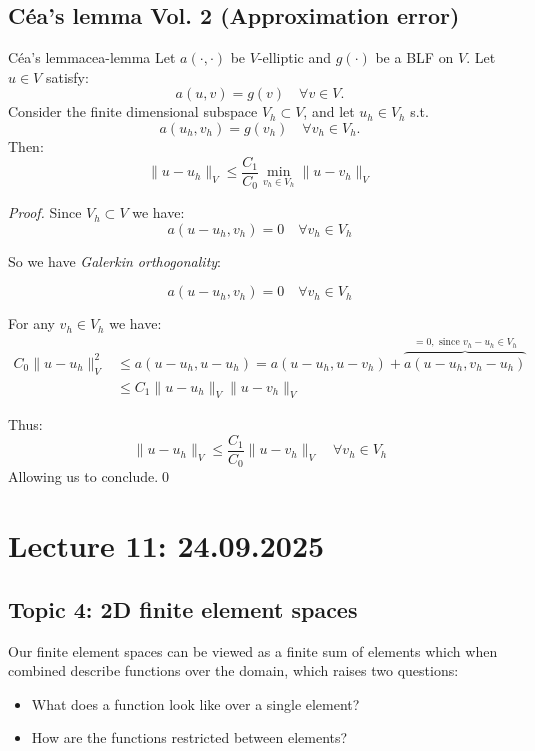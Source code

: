 \subsection{Céa's lemma Vol. 2 (Approximation error)}
\begin{theorem}{Céa's lemma}{cea-lemma}
    Let $a(\cdot, \cdot)$ be $V$-elliptic and $g(\cdot)$ be a BLF on $V$. Let $u \in V$ satisfy:
    \[
        a(u, v) = g(v) \quad \forall v \in V.
    \]
    Consider the finite dimensional subspace $V_h \subset V$, and let $u_h \in V_h$ s.t.
    \[
        a(u_h, v_h) = g(v_h) \quad \forall v_h \in V_h.
    \]
    Then:
    \[
        \|u - u_h\|_V \leq \frac{C_1}{C_0} \min_{v_h \in V_h} \|u - v_h\|_V
    \]
\end{theorem}
\begin{proof}
    Since $V_h \subset V$ we have:
    \[
        a(u - u_h, v_h) = 0 \quad \forall v_h \in V_h
    \]

    So we have \emph{Galerkin orthogonality}:

    \[
        a(u - u_h,v_h) = 0 \quad \forall v_h \in V_h
    \]

    For any $v_h \in V_h$ we have:
    \begin{align*}
        C_0 \|u - u_h\|_V^2 & \leq a(u - u_h, u - u_h) \tag{coercivity} = a(u - u_h, u - v_h) + \overbrace{a(u - u_h, v_h - u_h)}^{= 0, \text{ since } v_h - u_h \in V_h} \\
                            & \leq C_1 \|u - u_h\|_V \|u - v_h\|_V \tag{continuity}
    \end{align*}

    Thus:
    \[
        \|u - u_h\|_V \leq \frac{C_1}{C_0} \|u - v_h\|_V \quad \forall v_h \in V_h
    \]
    Allowing us to conclude.\qed
\end{proof}


\section{Lecture 11: 24.09.2025}

\subsection{Topic 4: 2D finite element spaces}

Our finite element spaces can be viewed as a finite sum of elements which when combined describe functions over the domain, which raises two questions:
\begin{itemize}
    \item What does a function look like over a single element?
    \item How are the functions restricted between elements?
\end{itemize}


